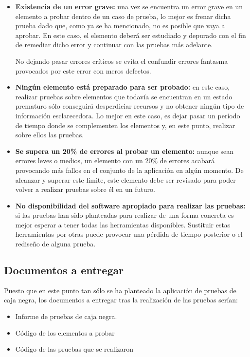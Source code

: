 \documentclass[10pt,a4paper]{article}
\begin{document}
		\begin{itemize}
			\item \textbf{Existencia de un error grave:} una vez se encuentra un error grave en un elemento a probar dentro de un caso de prueba, lo mejor es frenar dicha prueba dado que, como ya se ha mencionado, no es posible que vaya a aprobar. En este caso, el elemento deberá ser estudiado y depurado con el fin de remediar dicho error y continuar con las pruebas más adelante.
			
			No dejando pasar errores críticos se evita el confundir errores fantasma provocados por este error con meros defectos.
			
			\item \textbf{Ningún elemento está preparado para ser probado:} en este caso, realizar pruebas sobre elementos que todavía se encuentran en un estado prematuro sólo conseguirá desperdiciar recursos y no obtener ningún tipo de información esclarecedora. Lo mejor en este caso, es dejar pasar un período de tiempo donde se complementen los elementos y, en este punto, realizar sobre ellos las pruebas.
			
			\item \textbf{Se supera un 20\% de errores al probar un elemento:} aunque sean errores leves o medios, un elemento con un 20\% de errores acabará provocando más fallos en el conjunto de la aplicación en algún momento. De alcanzar y superar este límite, este elemento debe ser revisado para poder volver a realizar pruebas sobre él en un futuro. 
			
			\item \textbf{No disponibilidad del software apropiado para realizar las pruebas:} si las pruebas han sido planteadas para realizar de una forma concreta es mejor esperar a tener todas las herramientas disponibles. Sustituir estas herramientas por otras puede provocar una pérdida de tiempo posterior o el rediseño de alguna prueba.
		\end{itemize}

	\subsection{Documentos a entregar}
		Puesto que en este punto tan sólo se ha planteado la aplicación de pruebas de caja negra, los documentos a entregar tras la realización de las pruebas serían:
		
		\begin{itemize}
			\item Informe de pruebas de caja negra.
			\item Código de los elementos a probar
			\item Código de las pruebas que se realizaron
		\end{itemize}
\end{document}
